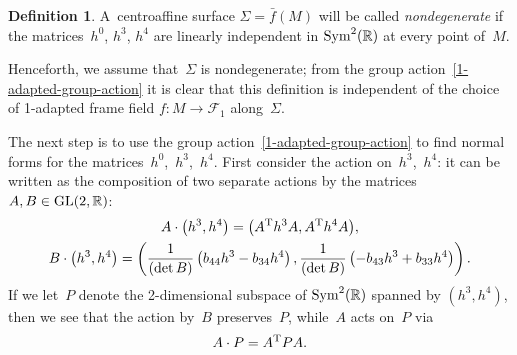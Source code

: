 \documentclass[pdftex]{sigma}
\numberwithin{equation}{section}
\theoremstyle{definition}
\newtheorem{dfn}[teo]{Definition}
\begin{document}
\begin{dfn}
\label{nondegenerate-def}
A~centroaf\/f\/ine surface $\Sigma = \bar{f}(M)$ will be called {\em nondegenerate} if the matri\-ces~$h^0$, $h^3$, $h^4$ are
linearly independent in ${\rm Sym}^2(\mathbb{R})$ at every point of~$M$.
\end{dfn}

Henceforth, we assume that~$\Sigma$ is nondegenerate; from the group action~\eqref{1-adapted-group-action} it is clear
that this def\/inition is independent of the choice of 1-adapted frame f\/ield $f:M \to \mathcal{F}_1$ along~$\Sigma$.

The next step is to use the group action~\eqref{1-adapted-group-action} to f\/ind normal forms for the matri\-ces~$h^0$,~$h^3$,~$h^4$.
First consider the action on~$h^3$,~$h^4$: it can be written as the composition of two separate actions by the matrices
$A,B \in {\rm GL}(2, \mathbb{R})$:
\begin{gather*}
A\cdot \big(h^3, h^4\big)=\big(A^{\rm T} h^3 A, A^{\rm T} h^4 A\big),
\\
B \cdot \big(h^3, h^4\big)=\left(\frac{1}{(\det B)} \left(b_{44} h^3 - b_{34} h^4 \right), \frac{1}{(\det
B)}\left(-b_{43} h^3 + b_{33} h^4 \right)\right).
\end{gather*}
If we let~$P$ denote the 2-dimensional subspace of ${\rm Sym}^2(\mathbb{R})$ spanned by $(h^3, h^4)$, then we see that
the action by~$B$ preserves~$P$, while~$A$ acts on~$P$ via
\begin{gather}
A\cdot P = A^{\rm T} P A.
\label{plane-action}
\end{gather}
\end{document}
